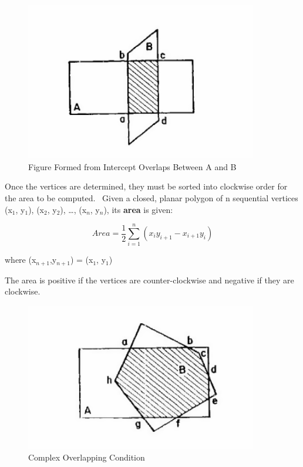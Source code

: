 \begin{figure}[hbtp] %
\centering
\includegraphics[width=0.9\textwidth, height=0.9\textheight, keepaspectratio=true]{media/image639.png}
\caption{Figure Formed from Intercept Overlaps Between A and B \protect \label{fig:figure-formed-from-intercept-overlaps-between}}
\end{figure}

Once the vertices are determined, they must be sorted into clockwise order for the area to be computed.~ Given a closed, planar polygon of n sequential vertices (x\(_{1}\), y\(_{1}\)), (x\(_{2}\), y\(_{2}\)), \ldots{}, (x\(_{n}\), y\(_{n}\)), its \textbf{area} is given:

\begin{equation}
Area = {\frac{1}{2}}\sum\limits_{i = 1}^n {({x_i}{y_{i + 1}} - {x_{i + 1}}{y_i})}
\end{equation}

where (x\(_{n+1}\),y\(_{n+1}\)) = (x\(_{1}\), y\(_{1}\))

The area is positive if the vertices are counter-clockwise and negative if they are clockwise.

\begin{figure}[hbtp] %
\centering
\includegraphics[width=0.9\textwidth, height=0.9\textheight, keepaspectratio=true]{media/image641.png}
\caption{Complex Overlapping Condition \protect \label{fig:complex-overlapping-condition}}
\end{figure}

